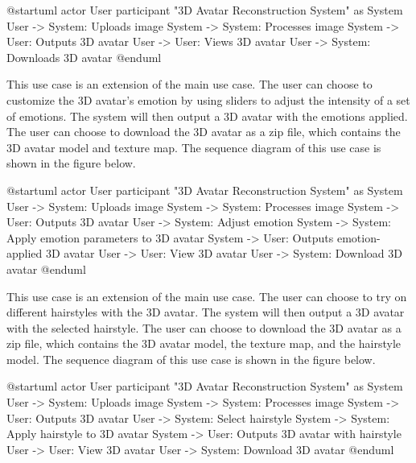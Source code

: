 \begin{umlfigure}
    @startuml
    actor User
    participant "3D Avatar Reconstruction System" as System
    User -> System: Uploads image
    System -> System: Processes image
    System -> User: Outputs 3D avatar
    User -> User: Views 3D avatar
    User -> System: Downloads 3D avatar
    @enduml
\end{umlfigure}



This use case is an extension of the main use case. The user can choose to customize the 3D avatar's emotion by using sliders to adjust the intensity of a set of emotions. The system will then output a 3D avatar with the emotions applied. The user can choose to download the 3D avatar as a zip file, which contains the 3D avatar model and texture map. The sequence diagram of this use case is shown in the figure below.

\begin{umlfigure}
    @startuml
    actor User
    participant "3D Avatar Reconstruction System" as System
    User -> System: Uploads image
    System -> System: Processes image
    System -> User: Outputs 3D avatar
    User -> System: Adjust emotion
    System -> System: Apply emotion parameters to 3D avatar
    System -> User: Outputs emotion-applied 3D avatar
    User -> User: View 3D avatar
    User -> System: Download 3D avatar
    @enduml

\end{umlfigure}


This use case is an extension of the main use case. The user can choose to try on different hairstyles with the 3D avatar. The system will then output a 3D avatar with the selected hairstyle. The user can choose to download the 3D avatar as a zip file, which contains the 3D avatar model, the texture map, and the hairstyle model. The sequence diagram of this use case is shown in the figure below.

\begin{umlfigure}
    @startuml
    actor User
    participant "3D Avatar Reconstruction System" as System
    User -> System: Uploads image
    System -> System: Processes image
    System -> User: Outputs 3D avatar
    User -> System: Select hairstyle
    System -> System: Apply hairstyle to 3D avatar
    System -> User: Outputs 3D avatar with hairstyle
    User -> User: View 3D avatar
    User -> System: Download 3D avatar
    @enduml
\end{umlfigure}

